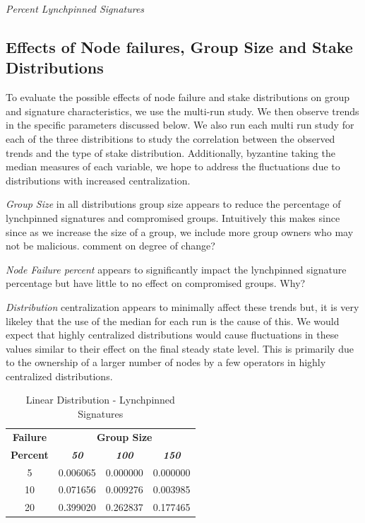 \documentclass[conference]{IEEEtran}
\begin{document}
\textit{Percent Lynchpinned Signatures}

\subsection{Effects of Node failures, Group Size and Stake Distributions}
To evaluate the possible effects of node failure and stake distributions on group and signature 
characteristics, we use the multi-run study. We then observe trends in the specific parameters 
discussed below. We also run each multi run study for each of the three distribitions to study 
the correlation between the observed trends and the type of stake distribution. Additionally, byzantine
taking the median measures of each variable, we hope to address the fluctuations due to distributions with
increased centralization. 

\textit{Group Size} in all distributions group size appears to reduce the percentage
of lynchpinned signatures and compromised groups. Intuitively this makes since since 
as we increase the size of a group, we include more group owners who may not be malicious. 
comment on degree of change?

\textit{Node Failure percent} appears to significantly impact the lynchpinned signature percentage
but have little to no effect on compromised groups. Why?

\textit{Distribution} centralization appears to minimally affect these trends but, it is very likeley
that the use of the median for each run is the cause of this. We would expect that highly centralized
distributions would cause fluctuations in these values similar to their effect on the final steady state 
level. This is primarily due to the ownership of a larger number of nodes by a few operators in highly 
centralized distributions. 

        \begin{table}[h!]
            \caption{Linear Distribution - Lynchpinned Signatures}
            \begin{center}
            \begin{tabular}{|c|c|c|c|}
            \hline
            \textbf{Failure}&\multicolumn{3}{|c|}{\textbf{Group Size}} \\
            \cline{2-4} 
            \textbf{Percent} & \textbf{\textit{50}}& \textbf{\textit{100}}& \textbf{\textit{150}} \\
            \hline
            5 &  0.006065 &  0.000000 &  0.000000 \\
            \hline
            10 &  0.071656 &  0.009276 &  0.003985 \\
            \hline
            20 &  0.399020 &  0.262837 &  0.177465 \\
            \hline
            \end{tabular}
            \label{lynchpinned_table1}
            \end{center}
        \end{table}
\end{document}
